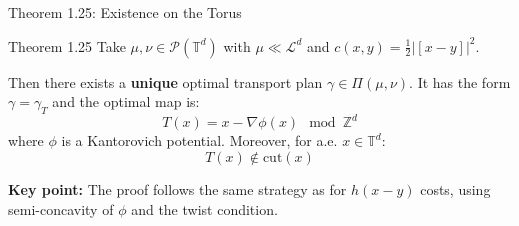 \documentclass[aspectratio=169]{beamer}
\newcommand{\Z}{\mathbb{Z}}
\newcommand{\Pp}{\mathcal{P}}
\newcommand{\Ld}{\mathcal{L}^d}
\newcommand{\Td}{\mathbb{T}^d}
\begin{document}
\begin{frame}{Theorem 1.25: Existence on the Torus}
\begin{block}{Theorem 1.25}
Take $\mu, \nu \in \Pp(\Td)$ with $\mu \ll \Ld$ and $c(x,y) = \frac{1}{2}|[x-y]|^2$.

Then there exists a \textbf{unique} optimal transport plan $\gamma \in \Pi(\mu, \nu)$. It has the form $\gamma = \gamma_T$ and the optimal map is:
\[
\boxed{T(x) = x - \nabla\phi(x) \mod \Z^d}
\]
where $\phi$ is a Kantorovich potential. Moreover, for a.e. $x \in \Td$:
\[
T(x) \notin \text{cut}(x)
\]
\end{block}

\vspace{0.3cm}
\textbf{Key point:} The proof follows the same strategy as for $h(x-y)$ costs, using semi-concavity of $\phi$ and the twist condition.
\end{frame}
\end{document}
